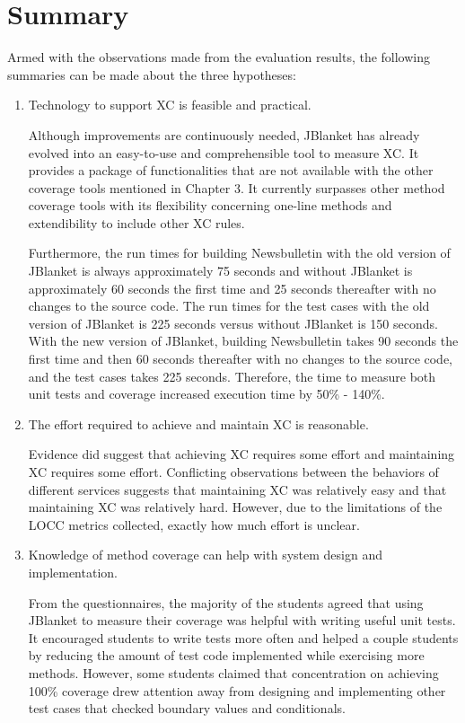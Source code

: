 \section{Summary} \label{section.summary}
Armed with the observations made from the evaluation results, the following
summaries can be made about the three hypotheses:
\begin{enumerate}
  \item Technology to support XC is feasible and practical.

        Although improvements are continuously needed, JBlanket has already
        evolved into an easy-to-use and comprehensible tool to measure XC.
        It provides a package of functionalities that are not available
        with the other coverage tools mentioned in Chapter 3.  It currently
        surpasses other method coverage tools with its flexibility
        concerning one-line methods and extendibility to include other XC
        rules.

        Furthermore, the run times for building Newsbulletin with the old
        version of JBlanket is always approximately 75 seconds and without
        JBlanket is approximately 60 seconds the first time and 25 seconds
        thereafter with no changes to the source code.  The run times for
        the test cases with the old version of JBlanket is 225 seconds
        versus without JBlanket is 150 seconds.  With the new version of
        JBlanket, building Newsbulletin takes 90 seconds the first time and
        then 60 seconds thereafter with no changes to the source code, and
        the test cases takes 225 seconds.  Therefore, the time to measure
        both unit tests and coverage increased execution time by 50\% -
        140\%.

  \item The effort required to achieve and maintain XC is reasonable.

        Evidence did suggest that achieving XC requires some effort and
        maintaining XC requires some effort.  Conflicting observations
        between the behaviors of different services suggests that
        maintaining XC was relatively easy and that maintaining XC was
        relatively hard.  However, due to the limitations of the LOCC
        metrics collected, exactly how much effort is unclear.

  \item Knowledge of method coverage can help with system design and 
        implementation.

        From the questionnaires, the majority of the students agreed that
        using JBlanket to measure their coverage was helpful with writing
        useful unit tests.  It encouraged students to write tests more
        often and helped a couple students by reducing the amount of test
        code implemented while exercising more methods.  However, some
        students claimed that concentration on achieving 100\% coverage
        drew attention away from designing and implementing other test
        cases that checked boundary values and conditionals.
\end{enumerate}

